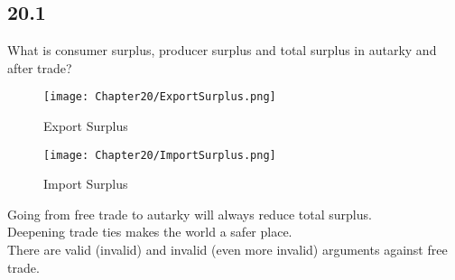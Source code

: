 \subsection*{20.1}
What is consumer surplus, producer surplus and total surplus in autarky and after trade?
\begin{figure}[H]
    \centering
    \texttt{[image: Chapter20/ExportSurplus.png]}
    \caption{Export Surplus}
    \label{fig:exportsurplus}
\end{figure}
\begin{figure}[H]
    \centering
    \texttt{[image: Chapter20/ImportSurplus.png]}
    \caption{Import Surplus}
    \label{fig:importsurplus}
\end{figure}
Going from free trade to autarky will always reduce total surplus.\\
Deepening trade ties makes the world a safer place.\\
There are valid (invalid) and invalid (even more invalid) arguments against free trade.
